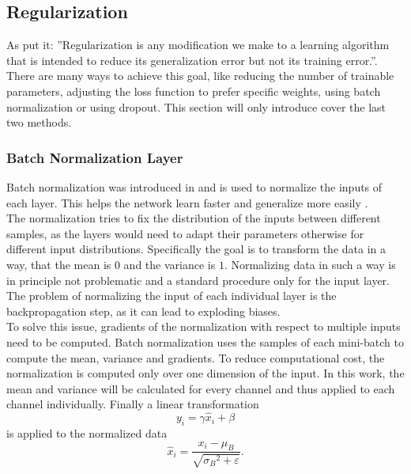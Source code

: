 \subsection{Regularization}\label{sec:regularization}
As \cite{deep_learning_book} put it: ''Regularization is any modification we make to a learning algorithm that is intended to reduce its generalization error but not its training error.''. There are many ways to achieve this goal, like reducing the number of trainable parameters, adjusting the loss function to prefer specific weights, using batch normalization or using dropout. This section will only introduce cover the last two methods.

\subsubsection{Batch Normalization Layer}\label{sec:batch_norm}
Batch normalization was introduced in and is used to normalize the inputs of each layer. This helps the network learn faster and generalize more easily \cite{batch_normalization_invention}.\\
The normalization tries to fix the distribution of the inputs between different samples, as the layers would need to adapt their parameters otherwise for different input distributions. Specifically the goal is to transform the data in a way, that the mean is $0$ and the variance is $1$. Normalizing data in such a way is in principle not problematic and a standard procedure only for the input layer. The problem of normalizing the input of each individual layer is the backpropagation step, as it can lead to exploding biases. \cite{batch_normalization_invention}\\
To solve this issue, gradients of the normalization with respect to multiple inputs need to be computed. Batch normalization uses the samples of each mini-batch to compute the mean, variance and gradients. To reduce computational cost, the normalization is computed only over one dimension of the input. In this work, the mean and variance will be calculated for every channel and thus applied to each channel individually. Finally a linear transformation
\begin{equation}
y_i = \gamma \hat{x}_i + \beta
\end{equation}
is applied to the normalized data
\begin{equation}
\hat{x}_i = \frac{x_i - \mu_B}{\sqrt{{\sigma_B}^2 + \varepsilon}}.
\end{equation}
